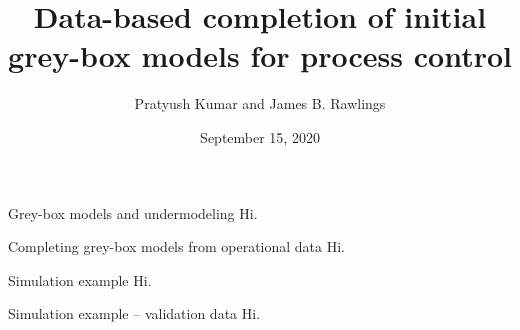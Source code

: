 \documentclass[xcolor=dvipsnames, 8pt]{beamer} %
\title[Data-based completion of initial grey-box models for process control]{Data-based completion of initial grey-box models for process control}
\date{September 15, 2020}
\author[Kumar and Rawlings]{\large Pratyush Kumar and James B. Rawlings}
\institute[UCSB]{
	\begin{minipage}{4in}
		\vspace{-10pt}
		\centering
		\raisebox{-0.1\height}{\texttt{[image: UCSB\_seal]}}
	\end{minipage}
	\vspace{10pt}
	\newline
	{\large Department of Chemical Engineering}
	\vspace{10pt}
	\newline
	{\large TWCCC Meeting (Virtual)}}
\begin{document}
\frame{\titlepage}

\begin{frame}{Grey-box models and undermodeling}
Hi.
\end{frame}

\begin{frame}{Completing grey-box models from operational data}
	Hi.
\end{frame}
	
\begin{frame}{Simulation example}
	Hi.
\end{frame}

\begin{frame}{Simulation example -- validation data}
	Hi.
\end{frame}

%
%
\end{document}

